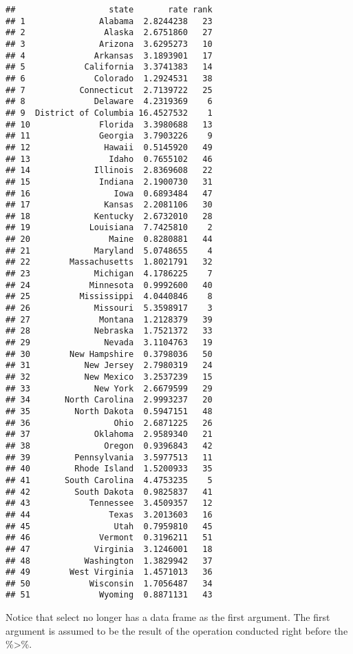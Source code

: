 \documentclass[
]{article}
\begin{document}
\begin{verbatim}
##                   state       rate rank
## 1               Alabama  2.8244238   23
## 2                Alaska  2.6751860   27
## 3               Arizona  3.6295273   10
## 4              Arkansas  3.1893901   17
## 5            California  3.3741383   14
## 6              Colorado  1.2924531   38
## 7           Connecticut  2.7139722   25
## 8              Delaware  4.2319369    6
## 9  District of Columbia 16.4527532    1
## 10              Florida  3.3980688   13
## 11              Georgia  3.7903226    9
## 12               Hawaii  0.5145920   49
## 13                Idaho  0.7655102   46
## 14             Illinois  2.8369608   22
## 15              Indiana  2.1900730   31
## 16                 Iowa  0.6893484   47
## 17               Kansas  2.2081106   30
## 18             Kentucky  2.6732010   28
## 19            Louisiana  7.7425810    2
## 20                Maine  0.8280881   44
## 21             Maryland  5.0748655    4
## 22        Massachusetts  1.8021791   32
## 23             Michigan  4.1786225    7
## 24            Minnesota  0.9992600   40
## 25          Mississippi  4.0440846    8
## 26             Missouri  5.3598917    3
## 27              Montana  1.2128379   39
## 28             Nebraska  1.7521372   33
## 29               Nevada  3.1104763   19
## 30        New Hampshire  0.3798036   50
## 31           New Jersey  2.7980319   24
## 32           New Mexico  3.2537239   15
## 33             New York  2.6679599   29
## 34       North Carolina  2.9993237   20
## 35         North Dakota  0.5947151   48
## 36                 Ohio  2.6871225   26
## 37             Oklahoma  2.9589340   21
## 38               Oregon  0.9396843   42
## 39         Pennsylvania  3.5977513   11
## 40         Rhode Island  1.5200933   35
## 41       South Carolina  4.4753235    5
## 42         South Dakota  0.9825837   41
## 43            Tennessee  3.4509357   12
## 44                Texas  3.2013603   16
## 45                 Utah  0.7959810   45
## 46              Vermont  0.3196211   51
## 47             Virginia  3.1246001   18
## 48           Washington  1.3829942   37
## 49        West Virginia  1.4571013   36
## 50            Wisconsin  1.7056487   34
## 51              Wyoming  0.8871131   43
\end{verbatim}

Notice that select no longer has a data frame as the first argument. The
first argument is assumed to be the result of the operation conducted
right before the \%\textgreater\%.
\end{document}
